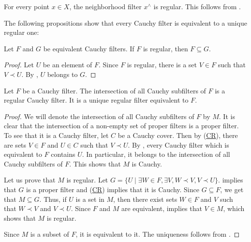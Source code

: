 \documentclass[reqno]{amsart}
\newcommand{\axref}[1]{(\hyperref[ax:#1]{#1})}
\theoremstyle{definition}
\theoremstyle{remark}
\numberwithin{figure}{section}
\newcommand{\rb}{\prec}
\begin{document}
\begin{example}
For every point $x \in X$, the neighborhood filter $x^\wedge$ is regular.
This follows from .
\end{example}

The following propositions show that every Cauchy filter is equivalent to a unique regular one:

\begin{prop}
Let $F$ and $G$ be equivalent Cauchy filters.
If $F$ is regular, then $F \subseteq G$.
\end{prop}
\begin{proof}
Let $U$ be an element of $F$.
Since $F$ is regular, there is a set $V \in F$ such that $V \rb U$.
By , $U$ belongs to $G$.
\end{proof}

\begin{prop}
Let $F$ be a Cauchy filter.
The intersection of all Cauchy subfilters of $F$ is a regular Cauchy filter.
It is a unique regular filter equivalent to $F$.
\end{prop}
\begin{proof}
We will denote the intersection of all Cauchy subfilters of $F$ by $M$.
It is clear that the intersection of a non-empty set of proper filters is a proper filter.
To see that it is a Cauchy filter, let $C$ be a Cauchy cover.
Then by \axref{CR}, there are sets $V \in F$ and $U \in C$ such that $V \rb U$.
By , every Cauchy filter which is equivalent to $F$ contains $U$.
In particular, it belongs to the intersection of all Cauchy subfilters of $F$.
This shows that $M$ is Cauchy.

Let us prove that $M$ is regular.
Let $G = \{ U \mid \exists W \in F, \exists V, W \rb V, V \rb U \}$.
 implies that $G$ is a proper filter and \axref{CR} implies that it is Cauchy.
Since $G \subseteq F$, we get that $M \subseteq G$.
Thus, if $U$ is a set in $M$, then there exist sets $W \in F$ and $V$ such that $W \rb V$ and $V \rb U$.
Since $F$ and $M$ are equivalent,  implies that $V \in M$, which shows that $M$ is regular.

Since $M$ is a subset of $F$, it is equivalent to it.
The uniqueness follows from .
\end{proof}
\end{document}
